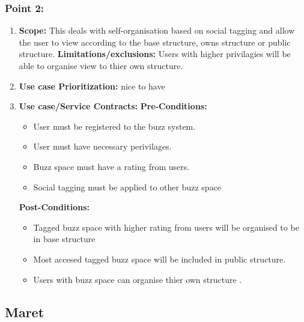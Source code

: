 \documentclass[11pt]{article}
\begin{document}
\subsubsection{Point 2:} 
\begin{enumerate}
\item 
\textbf{Scope:}
This deals with  self-organisation based on social tagging and allow the user to view according to the base structure, owns structure or public structure.
\newline
\textbf{Limitations/exclusions:} 
Users with higher privilagies will be able to organise view to thier own structure.
\item 
\textbf{Use case Prioritization:} nice to have

\item 
\textbf{Use case/Service Contracts:} 
\newline
\textbf{Pre-Conditions: }
\begin{itemize}
\item User must be registered to the buzz system.
\item User must have necessary perivilages.
\item Buzz space must have a rating from users.
\item Social tagging must be applied to other buzz space
\end{itemize}
 

\textbf{Post-Conditions: }
\begin{itemize}
\item Tagged buzz space with higher rating from users will be organised to be in base structure
\item Most accesed tagged buzz space will be included in public structure.
\item Users with buzz space can organise thier own structure .
\end{itemize}
\end{enumerate}

\newpage

\subsection{Maret}
\end{document}
